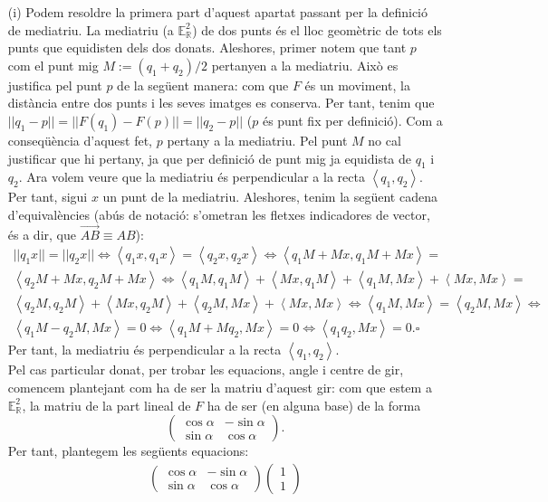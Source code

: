 \documentclass[10pt]{article}
\newcommand{\euc}[1]{\mathbb{E}_{\mathbb{R}}^{#1}}
\newcommand{\norm}[1]{||#1||}
\newcommand{\scal}[2]{\left<#1,#2\right>}
\begin{document}
\begin{itemize}
\item[(i)] Podem resoldre la primera part d'aquest apartat passant per la definició de mediatriu. La mediatriu (a $\euc{2}$) de dos punts és el lloc geomètric de tots els punts que equidisten dels dos donats. Aleshores, primer notem que tant $p$ com el punt mig $M:=(q_1+q_2)/2$ pertanyen a la mediatriu. Això es justifica pel punt $p$ de la següent manera: com que $F$ és un moviment, la distància entre dos punts i les seves imatges es conserva. Per tant, tenim que $\norm{q_1-p}=\norm{F(q_1)-F(p)}=\norm{q_2-p}$ ($p$ és punt fix per definició). Com a conseqüència d'aquest fet, $p$ pertany a la mediatriu. Pel punt $M$ no cal justificar que hi pertany, ja que per definició de punt mig ja equidista de $q_1$ i $q_2$. Ara volem veure que la mediatriu és perpendicular a la recta $\left<q_1,q_2\right>$. Per tant, sigui $x$ un punt de la mediatriu. Aleshores, tenim la següent cadena d'equivalències (abús de notació: s'ometran les fletxes indicadores de vector, és a dir, que $\vec{AB}\equiv AB$):
    \begin{multline}
	\norm{q_1x}=\norm{q_2x}\iff\scal{q_1x}{q_1x}=\scal{q_2x}{q_2x}\iff\scal{q_1M+Mx}{q_1M+Mx}= \\ \scal{q_2M+Mx}{q_2M+Mx}\iff\scal{q_1M}{q_1M}+\scal{Mx}{q_1M}+\scal{q_1M}{Mx}+\scal{Mx}{Mx}= \\ \scal{q_2M}{q_2M}+\scal{Mx}{q_2M}+\scal{q_2M}{Mx}+\scal{Mx}{Mx}\iff\scal{q_1M}{Mx}=\scal{q_2M}{Mx}\iff \\ \scal{q_1M-q_2M}{Mx}=0\iff\scal{q_1M+Mq_2}{Mx}=0\iff\scal{q_1q_2}{Mx}=0.\square
    \end{multline}
    Per tant, la mediatriu és perpendicular a la recta $\scal{q_1}{q_2}$.\\
    Pel cas particular donat, per trobar les equacions, angle i centre de gir, comencem plantejant com ha de ser la matriu d'aquest gir: com que estem a $\euc{2}$, la matriu de la part lineal de $F$ ha de ser (en alguna base) de la forma
    \[
    \begin{pmatrix}
    \cos{\alpha} & -\sin{\alpha}\\
    \sin{\alpha} & \cos{\alpha}
    \end{pmatrix}.
    \]
    Per tant, plantegem les següents equacions:
    \begin{align}
        \begin{pmatrix}
        \cos{\alpha} & -\sin{\alpha}\\
        \sin{\alpha} & \cos{\alpha}
        \end{pmatrix}\begin{pmatrix}1\\ 1

\end{pmatrix}
\end{align}
\end{itemize}
\end{document}
